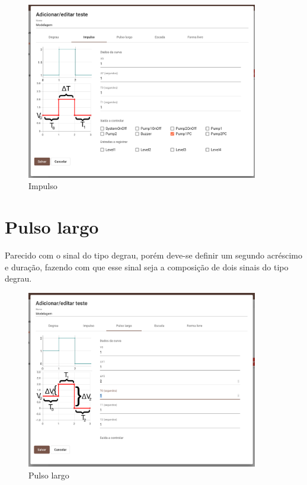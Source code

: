 \begin{figure}[ht!]
    \centering
    \includegraphics[width=0.9\textwidth]{imgs/system-response4}
    \caption[Impulso]{Impulso}%
    \label{fig:system-response4}
\end{figure}

\newpage{}
\section{Pulso largo}%
\label{sec:wide-pulse}

Parecido com o sinal do tipo degrau, porém deve-se definir um segundo acréscimo
e duração, fazendo com que esse sinal seja a composição de dois sinais do tipo
degrau.

\begin{figure}[ht!]
    \centering
    \includegraphics[width=0.9\textwidth]{imgs/system-response5}
    \caption[Pulso largo]{Pulso largo}%
    \label{fig:system-response5}
\end{figure}

